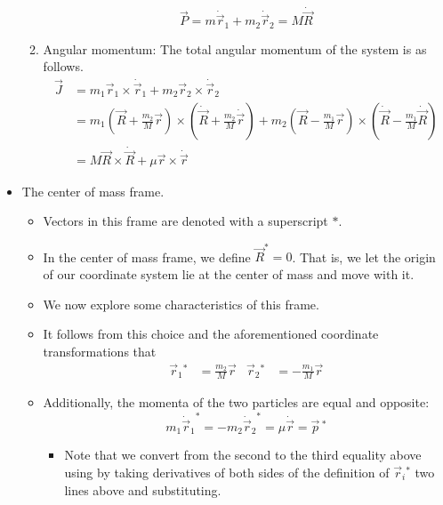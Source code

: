 \documentclass[../notes.tex]{subfiles}
\begin{document}
\begin{itemize}
\begin{enumerate}
        \begin{equation*}
            \vec{P} = m\dot{\vec{r}}_1+m_2\dot{\vec{r}}_2 = M\dot{\vec{R}}
        \end{equation*}
        \item Angular momentum: The total angular momentum of the system is as follows.
        \begin{align*}
            \vec{J} &= m_1\vec{r}_1\times\dot{\vec{r}}_1+m_2\vec{r}_2\times\dot{\vec{r}}_2\\
            &= m_1\left( \vec{R}+\frac{m_2}{M}\vec{r} \right)\times\left( \dot{\vec{R}}+\frac{m_2}{M}\dot{\vec{r}} \right)+m_2\left( \vec{R}-\frac{m_1}{M}\vec{r} \right)\times\left( \dot{\vec{R}}-\frac{m_1}{M}\dot{\vec{R}} \right)\\
            &= M\vec{R}\times\dot{\vec{R}}+\mu\vec{r}\times\dot{\vec{r}}
        \end{align*}
    \end{enumerate}
    \item The center of mass frame.
    \begin{itemize}
        \item Vectors in this frame are denoted with a superscript $*$.
        \item In the center of mass frame, we define $\vec{R}^*=0$. That is, we let the origin of our coordinate system lie at the center of mass and move with it.
        \item We now explore some characteristics of this frame.
        \item It follows from this choice and the aforementioned coordinate transformations that
        \begin{align*}
            \vec{r}_1{}^* &= \frac{m_2}{M}\vec{r}&
            \vec{r}_2{}^* &= -\frac{m_1}{M}\vec{r}
        \end{align*}
        \item Additionally, the momenta of the two particles are equal and opposite:
        \begin{equation*}
            m_1{\dot{\vec{r}}_1}^* = -m_2{\dot{\vec{r}}_2}^* = \mu\dot{\vec{r}} = \vec{p}{\,}^*
        \end{equation*}
        \begin{itemize}
            \item Note that we convert from the second to the third equality above using by taking derivatives of both sides of the definition of $\vec{r}_i{}^*$ two lines above and substituting.
        \end{itemize}

\end{itemize}
\end{itemize}
\end{document}
